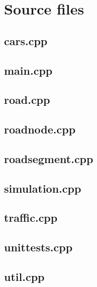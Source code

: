 \documentclass{article}
\begin{document}
\section{Source files}
  \subsection{cars.cpp}
    
  \subsection{main.cpp}
    
  \subsection{road.cpp}
    
  \subsection{roadnode.cpp}
    
  \subsection{roadsegment.cpp}
    
  \subsection{simulation.cpp}
    
  \subsection{traffic.cpp}
    
  \subsection{unittests.cpp}
    
  \subsection{util.cpp}
    
\end{document}
